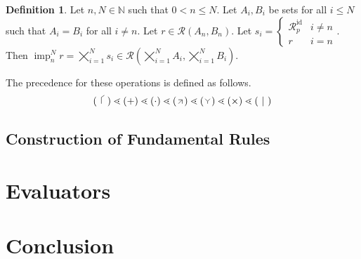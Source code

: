 \documentclass{article}
\theoremstyle{definition}
\newtheorem{definition}{Definition}[subsection]
\theoremstyle{plain}
\def\rule{\mathcal{R}}
\DeclareMathOperator{\imp}{imp}
\newcommand{\depp}{\mathbin{\: \, \mathclap{\tikz{
  \draw (-.20em, -.20em) -- (.20em, .20em);
  \draw (-.20em,  .20em) -- (.20em, .20em);
  \draw ( .20em, -.20em) -- (.20em, .20em);
}}\: \,}}
\newcommand{\indp}{\mathbin{\: \,\mathclap{\tikz{
  \draw (0, 0) -- (0, -.25em);
  \draw (0, 0) -- (-.25em, .25em);
  \draw (0, 0) -- (.25em, .25em);
}}\: \,}}
\newcommand{\gate}{\mathopen{\; \mathclap{\tikz{
  \draw (0, -0.35em) -- (0, 0.30em);
  \draw (0,  0.30em) -- (0.30em, 0.50em);
}}\; \!}}
\begin{document}
\begin{definition}
  Let $ n, N \in \mathbb{N} $ such that $ 0 < n \leq N $.
  Let $ A_i, B_i $ be sets for all $ i \leq N $
  such  that $ A_i = B_i $ for all $ i \neq n $.
  Let $ r \in \rule (A_n, B_n)$.
  Let $ s_i = \begin{cases} \rule_p^{\text{id}} & i \neq n \\ r & i = n \end{cases} $.
  Then $ \imp_n^N r = \bigtimes_{i=1}^N s_i \in \rule (\bigtimes_{i=1}^N A_i, \bigtimes_{i=1}^N B_i) $.
\end{definition}


The precedence for these operations is defined as follows.
\begin{align*}
  (~\gate~) \lessdot (+) \lessdot (\cdot) \lessdot (\depp) \lessdot (\indp) \lessdot (\times) \lessdot (~\rvert~)
\end{align*}

\subsection{Construction of Fundamental Rules}

\section{Evaluators}

\section{Conclusion}
\end{document}
